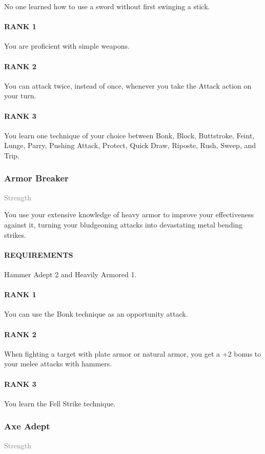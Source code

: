 \normalsize
No one learned how to use a sword without first swinging a stick.
\paragraph{RANK 1} You are proficient with simple weapons.
\paragraph{RANK 2} You can attack twice, instead of once, whenever you take the Attack action on your turn.
\paragraph{RANK 3} You learn one technique of your choice between Bonk, Block, Buttstroke, Feint, Lunge, Parry, Pushing Attack, Protect, Quick Draw, Riposte, Rush, Sweep, and Trip.

\subsubsection{Armor Breaker} \label{feat::armorbreaker}
\small{\textcolor{gray}{Strength}}

\normalsize
You use your extensive knowledge of heavy armor to improve your effectiveness against it, turning your bludgeoning attacks into devastating metal bending strikes.
\paragraph{REQUIREMENTS} Hammer Adept 2 and Heavily Armored 1.
\paragraph{RANK 1} You can use the Bonk technique as an opportunity attack.
\paragraph{RANK 2} When fighting a target with plate armor or natural armor, you get a +2 bonus to your melee attacks with hammers.
\paragraph{RANK 3} You learn the Fell Strike technique.

\subsubsection{Axe Adept} \label{feat::axeadept}
\small{\textcolor{gray}{Strength}}

